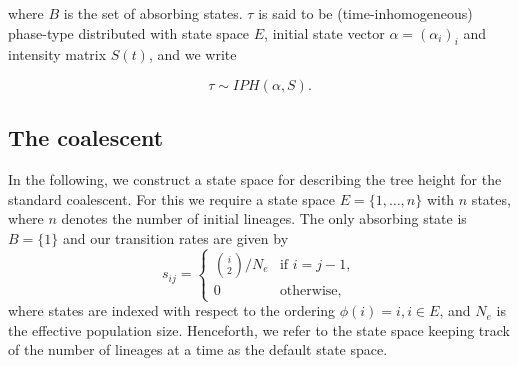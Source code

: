 \documentclass[hidelinks,11pt]{article}
\begin{document}
    where $B$ is the set of absorbing states. $\tau$ is said to be (time-inhomogeneous) phase-type distributed with state space $E$, initial state vector $\alpha=(\alpha_i)_i$ and intensity matrix $S(t)$, and we write

    \begin{equation*}
        \tau \sim IPH(\alpha,S).
    \end{equation*}

    \subsection{The coalescent}\label{subsec:the-coalescent}
    In the following, we construct a state space for describing the tree height for the standard coalescent.
    For this we require a state space $E=\{1, \dots, n\}$ with $n$ states, where $n$ denotes the number of initial lineages.
    The only absorbing state is $B=\{1\}$ and our transition rates are given by
    \begin{equation*}
        s_{ij} = \begin{cases}
                     \binom{i}{2} / N_e & \text{if } i = j - 1, \\ 0 & \text{otherwise,}
        \end{cases}
    \end{equation*}
    where states are indexed with respect to the ordering $\phi(i) = i, i \in E$, and $N_e$ is the effective population size.
    Henceforth, we refer to the state space keeping track of the number of lineages at a time as the default state space.
\end{document}
